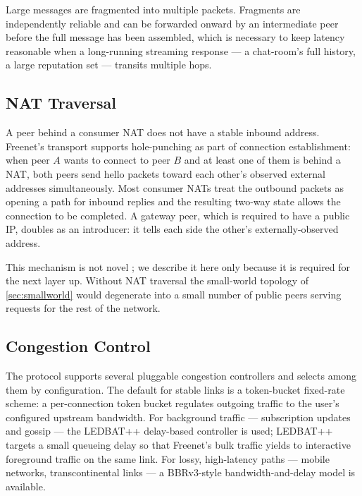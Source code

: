 Large messages are fragmented into multiple packets. Fragments are independently reliable and can be forwarded onward by an intermediate peer before the full message has been assembled, which is necessary to keep latency reasonable when a long-running streaming response --- a chat-room's full history, a large reputation set --- transits multiple hops.

\subsection{NAT Traversal}

A peer behind a consumer NAT does not have a stable inbound address. Freenet's transport supports hole-punching as part of connection establishment: when peer $A$ wants to connect to peer $B$ and at least one of them is behind a NAT, both peers send hello packets toward each other's observed external addresses simultaneously. Most consumer NATs treat the outbound packets as opening a path for inbound replies and the resulting two-way state allows the connection to be completed. A gateway peer, which is required to have a public IP, doubles as an introducer: it tells each side the other's externally-observed address.

This mechanism is not novel \citep{ford2005peer}; we describe it here only because it is required for the next layer up. Without NAT traversal the small-world topology of \cref{sec:smallworld} would degenerate into a small number of public peers serving requests for the rest of the network.

\subsection{Congestion Control}

The protocol supports several pluggable congestion controllers and selects among them by configuration. The default for stable links is a token-bucket fixed-rate scheme: a per-connection token bucket regulates outgoing traffic to the user's configured upstream bandwidth. For background traffic --- subscription updates and gossip --- the LEDBAT++ delay-based controller \citep{rfc6817,balasubramanian2020ledbat} is used; LEDBAT++ targets a small queueing delay so that Freenet's bulk traffic yields to interactive foreground traffic on the same link. For lossy, high-latency paths --- mobile networks, transcontinental links --- a BBRv3-style \citep{cardwell2016bbr} bandwidth-and-delay model is available.

